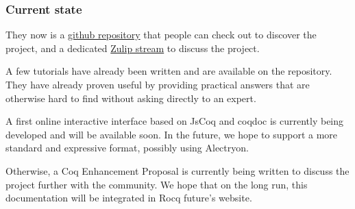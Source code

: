 \documentclass{article}[12pt]
\begin{document}
\subsubsection*{Current state}

They now is a \href{https://github.com/Zimmi48/platform-docs}{github repository}
that people can check out to discover the project, and a dedicated
\href{https://coq.zulipchat.com/#narrow/stream/437203-Platform-docs}{Zulip stream}
to discuss the project.

A few tutorials have already been written and are available on the repository.
They have already proven useful by providing practical answers that are
otherwise hard to find without asking directly to an expert.

A first online interactive interface based on JsCoq and coqdoc is currently
being developed and will be available soon.
In the future, we hope to support a more standard and expressive format,
possibly using Alectryon.

Otherwise, a Coq Enhancement Proposal is currently being written to discuss the
project further with the community.
We hope that on the long run, this documentation will be integrated in Rocq
future's website.
\end{document}
